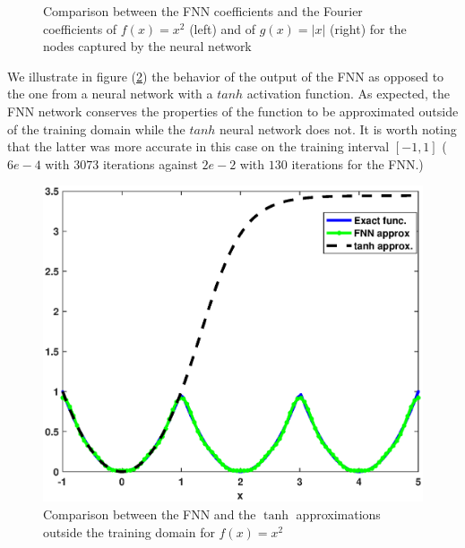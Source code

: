 \documentclass[AMS,STIX1COL]{WileyNJD-v2}
\begin{document}
  \begin{figure}[!htb]
    \centering
    \caption{\;Comparison between the FNN coefficients and the Fourier coefficients of $f(x) = x^2$ (left) and of $g(x) = |x|$ (right) for the nodes captured by the neural network}
    \label{fig:Fnnx2}
\end{figure}
We illustrate in figure (\ref{fig:Fnnx2out}) the behavior of the output of the FNN as opposed to the one from a neural network with a $tanh$ activation function. As expected, the FNN network conserves the  properties of the function to be approximated outside of the training domain while the $tanh$ neural network does not. It is worth noting that the latter was more accurate in this case on the training interval $[-1, 1]$ ($6e-4$ with $3073$ iterations against $2e-2$ with $130$ iterations for the FNN.)
\begin{figure}[!htb]
    \centering
    \includegraphics[width=.45\textwidth]{fnnvstanhoutx2.eps}
    \caption{\;Comparison between the FNN and the $\tanh$ approximations outside the training domain for $f(x) = x^2$ }
    \label{fig:Fnnx2out}
\end{figure}
\end{document}
